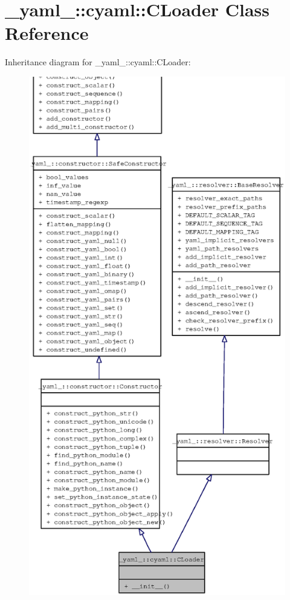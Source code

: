\section{\_\-yaml\_\-::cyaml::CLoader Class Reference}
\label{class__yaml___1_1cyaml_1_1CLoader}
Inheritance diagram for \_\-yaml\_\-::cyaml::CLoader:\nopagebreak
\begin{figure}[H]
\begin{center}
\leavevmode
\includegraphics[width=400pt]{class__yaml___1_1cyaml_1_1CLoader__inherit__graph}
\end{center}
\end{figure}
